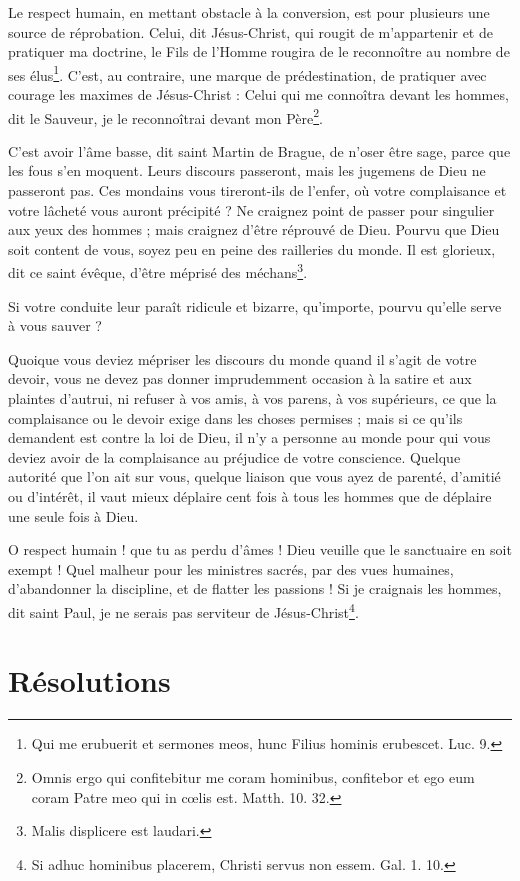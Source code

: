 \documentclass[instructions.tex]{subfiles}
\begin{document}
\secundo Le respect humain, en mettant obstacle à la conversion, est pour plusieurs une source de réprobation. Celui, dit Jésus-Christ, qui rougit de m’appartenir et de pratiquer ma doctrine, le Fils de l’Homme rougira de le reconnoître au nombre de ses élus\footnote{Qui me erubuerit et sermones meos, hunc Filius hominis erubescet. Luc. 9.}. C’est, au contraire, une marque de prédestination, de pratiquer avec courage les maximes de Jésus-Christ : Celui qui me connoîtra devant les hommes, dit le Sauveur, je le reconnoîtrai devant mon Père\footnote{Omnis ergo qui confitebitur me coram hominibus, confitebor et ego eum coram Patre meo qui in cœlis est. Matth. 10. 32.}.

C’est avoir l’âme basse, dit saint Martin de Brague, de n’oser être sage, parce que les fous s’en moquent. Leurs discours passeront, mais les jugemens de Dieu ne passeront pas. Ces mondains vous tireront-ils de l’enfer, où votre complaisance et votre lâcheté vous auront précipité ? Ne craignez point de passer pour singulier aux yeux des hommes ; mais craignez d’être réprouvé de Dieu. Pourvu que Dieu soit content de vous, soyez peu en peine des railleries du monde. Il est glorieux, dit ce saint évêque, d’être méprisé des méchans\footnote{Malis displicere est laudari.}.

Si votre conduite leur paraît ridicule et bizarre, qu’importe, pourvu qu’elle serve à vous sauver ?

Quoique vous deviez mépriser les discours du monde quand il s’agit de votre devoir, vous ne devez pas donner imprudemment occasion à la satire et aux plaintes d’autrui, ni refuser à vos amis, à vos parens, à vos supérieurs, ce que la complaisance ou le devoir exige dans les choses permises ; mais si ce qu’ils demandent est contre la loi de Dieu, il n’y a personne au monde pour qui vous deviez avoir de la complaisance au préjudice de votre conscience. Quelque autorité que l’on ait sur vous, quelque liaison que vous ayez de parenté, d’amitié ou d’intérêt, il vaut mieux déplaire cent fois à tous les hommes que de déplaire une seule fois à Dieu.

O respect humain ! que tu as perdu d’âmes ! Dieu veuille que le sanctuaire en soit exempt ! Quel malheur pour les ministres sacrés, par des vues humaines, d’abandonner la discipline, et de flatter les passions ! Si je craignais les hommes, dit saint Paul, je ne serais pas serviteur de Jésus-Christ\footnote{Si adhuc hominibus placerem, Christi servus non essem. Gal. 1. 10.}.

\section{Résolutions}
\end{document}
